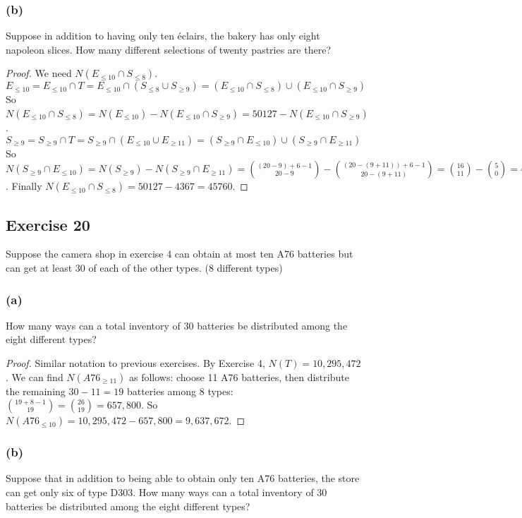 \documentclass[14pt]{extarticle}
\begin{document}
\subsubsection{(b)}
Suppose in addition to having only ten éclairs, the bakery has only eight napoleon slices. How many different selections of twenty pastries are there?

\begin{proof}
     We need \(N(E_{\leq 10} \cap S_{\leq 8})\).
     \[
          E_{\leq 10} = E_{\leq 10} \cap T = E_{\leq 10} \cap (S_{\leq 8} \cup S_{\geq 9}) = (E_{\leq 10} \cap S_{\leq 8}) \cup (E_{\leq 10} \cap S_{\geq 9})
     \]
     So \(N(E_{\leq 10} \cap S_{\leq 8}) = N(E_{\leq 10}) - N(E_{\leq 10} \cap S_{\geq 9}) = 50127 - N(E_{\leq 10} \cap
     S_{\geq 9})\).
     \[
          S_{\geq 9} = S_{\geq 9} \cap T = S_{\geq 9} \cap (E_{\leq 10} \cup E_{\geq 11}) = (S_{\geq 9} \cap E_{\leq 10}) \cup
          (S_{\geq 9} \cap E_{\geq 11})
     \]
     So \(N(S_{\geq 9} \cap E_{\leq 10}) = N(S_{\geq 9}) - N(S_{\geq 9} \cap E_{\geq 11}) = \binom{(20-9)+6-1}{20-9} -
     \binom{(20-(9+11))+6-1}{20-(9+11)} = \binom{16}{11} - \binom{5}{0} = 4368-1 = 4367\). Finally \(N(E_{\leq 10} \cap
     S_{\leq 8}) = 50127 - 4367 = 45760\).
\end{proof}

\subsection{Exercise 20}
Suppose the camera shop in exercise 4 can obtain at most ten A76 batteries but can get at least 30 of each of the other
types. (8 different types)

\subsubsection{(a)}
How many ways can a total inventory of 30 batteries be distributed among the eight different types?

\begin{proof}
     Similar notation to previous exercises. By Exercise 4, \(N(T) = 10,295,472\). We can find \(N(A76_{\geq 11})\) as follows:
     choose 11 A76 batteries, then distribute the remaining \(30-11=19\) batteries among 8 types: \(\binom{19+8-1}{19} =
     \binom{26}{19} = 657,800\). So \(N(A76_{\leq 10}) = 10,295,472 - 657,800 = 9,637,672\).
\end{proof}

\subsubsection{(b)}
Suppose that in addition to being able to obtain only ten A76 batteries, the store can get only six of type D303. How many
ways can a total inventory of 30 batteries be distributed among the eight different types?
\end{document}
